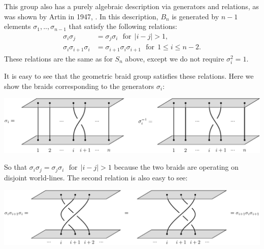 \documentclass[aps, tightenlines, letterpaper, onecolumn, superscriptaddress, notitlepage, 11pt, groupedaddress]{revtex4-1}
\begin{document}
This group also has a purely algebraic description via
generators and relations, as was shown by Artin in 1947, \cite{Artin1947,Birman1974}.
In this description, 
$B_n$ is generated by $n-1$ elements $\sigma_1,..,\sigma_{n-1}$ that satisfy
the following relations:
\begin{align*}
    \sigma_i \sigma_j &= \sigma_j \sigma_i \ \ \ \mbox{for}\ \ |i-j|>1,\\
    \sigma_i \sigma_{i+1} \sigma_i &= \sigma_{i+1} \sigma_i \sigma_{i+1} \ \ \ \mbox{for}\ \ 1\le i \le n-2.
\end{align*}
These relations are the same as for $S_n$ above, except 
we do not require $\sigma_i^2 = 1.$

It is easy to see that the geometric braid group satisfies these
relations. Here we show the braids corresponding to the generators $\sigma_i:$
\begin{center}
\includegraphics[]{pic-braid-sigma.pdf}
\end{center}
So that 
$\sigma_i \sigma_j = \sigma_j \sigma_i \ \ \ \mbox{for}\ \ |i-j|>1$
because the two braids are operating on disjoint world-lines.
The second relation is also easy to see:
\begin{center}
\includegraphics[]{pic-braid-YB.pdf}
\end{center}
\end{document}
